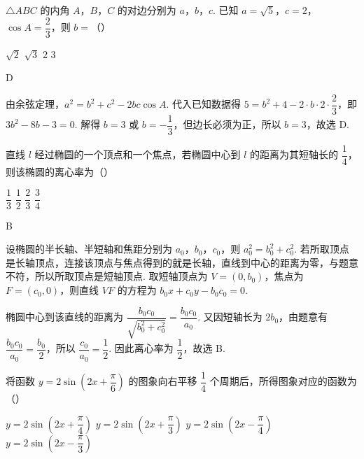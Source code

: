 \begin{problem}
\(\triangle ABC\) 的内角 \(A\)，\(B\)，\(C\) 的对边分别为 \(a\)，\(b\)，\(c\). 已知 \(a=\sqrt5\)，\(c=2\)，\(\cos A=\dfrac23\)，则 \(b=\)（\quad）

\choices
    {\(\sqrt2\)}
    {\(\sqrt3\)}
    {\(2\)}
    {\(3\)}
\end{problem}

\begin{answer}
D
\end{answer}

\begin{solution}
由余弦定理，\(a^2=b^2+c^2-2bc\cos A\). 代入已知数据得 \(5=b^2+4-2\cdot b\cdot2\cdot\dfrac23\)，即 \(3b^2-8b-3=0\). 解得 \(b=3\) 或 \(b=-\dfrac13\)，但边长必须为正，所以 \(b=3\)，故选 D.
\end{solution}

\begin{problem}
直线 \(l\) 经过椭圆的一个顶点和一个焦点，若椭圆中心到 \(l\) 的距离为其短轴长的 \(\dfrac14\)，则该椭圆的离心率为（\quad）

\choices
    {\(\dfrac13\)}
    {\(\dfrac12\)}
    {\(\dfrac23\)}
    {\(\dfrac34\)}
\end{problem}

\begin{answer}
B
\end{answer}

\begin{solution}
设椭圆的半长轴、半短轴和焦距分别为 \(a_0\)，\(b_0\)，\(c_0\)，则 \(a_0^2=b_0^2+c_0^2\). 若所取顶点是长轴顶点，连接该顶点与焦点得到的就是长轴，直线到中心的距离为零，与题意不符，所以所取顶点是短轴顶点. 取短轴顶点为 \(V=(0,b_0)\)，焦点为 \(F=(c_0,0)\)，则直线 \(VF\) 的方程为 \(b_0x+c_0y-b_0c_0=0\).

椭圆中心到该直线的距离为 \(\dfrac{b_0c_0}{\sqrt{b_0^2+c_0^2}}=\dfrac{b_0c_0}{a_0}\). 又因短轴长为 \(2b_0\)，由题意有 \(\dfrac{b_0c_0}{a_0}=\dfrac{b_0}{2}\)，所以 \(\dfrac{c_0}{a_0}=\dfrac12\). 因此离心率为 \(\dfrac12\)，故选 B.
\end{solution}

\begin{problem}
将函数 \(y=2\sin\!\left(2x+\dfrac{\pi}{6}\right)\) 的图象向右平移 \(\dfrac14\) 个周期后，所得图象对应的函数为（\quad）

\choices
    {\(y=2\sin\!\left(2x+\dfrac{\pi}{4}\right)\)}
    {\(y=2\sin\!\left(2x+\dfrac{\pi}{3}\right)\)}
    {\(y=2\sin\!\left(2x-\dfrac{\pi}{4}\right)\)}
    {\(y=2\sin\!\left(2x-\dfrac{\pi}{3}\right)\)}
\end{problem}

